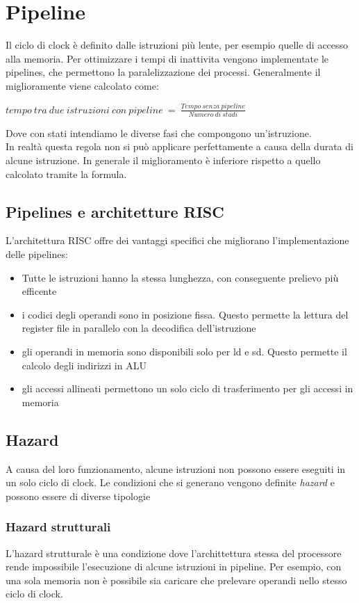 \documentclass[12pt, a4paper]{article}
\begin{document}
\newpage
\section{Pipeline}
Il ciclo di clock è definito dalle istruzioni più lente, per esempio quelle di accesso alla memoria. Per ottimizzare
i tempi di inattivita vengono implementate le pipelines, che permettono la paralelizzazione dei processi. 
Generalmente il miglioramente viene calcolato come:
\begin{center}
  $tempo\ tra\ due\ istruzioni\ con\ pipeline\ =\ \frac{Tempo\ senza\ pipeline}{Numero\ di\ stadi}$
\end{center}
Dove con stati intendiamo le diverse fasi che compongono un'istruzione.\\In realtà questa regola non si può
applicare perfettamente a causa della durata di alcune istruzione. In generale il miglioramento è inferiore 
rispetto a quello calcolato tramite la formula.

\subsection{Pipelines e architetture RISC}
L'architettura RISC offre dei vantaggi specifici che migliorano l'implementazione delle pipelines:
\begin{itemize}
  \item Tutte le istruzioni hanno la stessa lunghezza, con conseguente prelievo più efficente
  \item i codici degli operandi sono in posizione fissa. Questo permette la lettura del register file in 
  parallelo con la decodifica dell'istruzione
  \item gli operandi in memoria sono disponibili solo per ld e sd. Questo permette il calcolo degli indirizzi in ALU
  \item gli accessi allineati permettono un solo ciclo di trasferimento per gli accessi in memoria
\end{itemize}

\newpage
\subsection{Hazard}
A causa del loro funzionamento, alcune istruzioni non possono essere eseguiti in un solo ciclo di clock. Le 
condizioni che si generano vengono definite \textit{hazard} e possono essere di diverse tipologie

\subsubsection{Hazard strutturali}
L'hazard strutturale è una condizione dove l'archittettura stessa del processore rende impossibile l'esecuzione 
di alcune istruzioni in pipeline. Per esempio, con una sola memoria non è possibile sia caricare che prelevare 
operandi nello stesso ciclo di clock.
\end{document}
